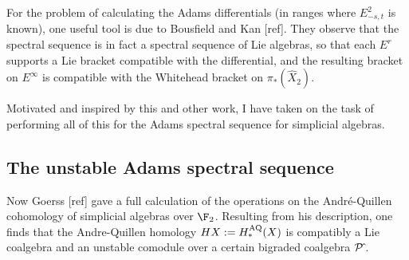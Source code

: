 \documentclass[11pt]{article}
\begin{document}
For the problem of calculating the Adams differentials (in ranges where $E^2_{-s,t}$ is known), one useful tool is due to Bousfield and Kan [ref]. They observe that the spectral sequence is in fact a spectral sequence of Lie algebras, so that each $E^r$ supports a Lie bracket compatible with the differential, and the resulting bracket on $E^\infty$ is compatible with the Whitehead bracket on $\pi_*(\hat X_2)$.

Motivated and inspired by this and other work, I have taken on the task of performing all of this for the Adams spectral sequence for simplicial algebras.







\subsection*{The unstable Adams spectral sequence}
Now Goerss [ref] gave a full calculation of the operations on the Andr\'e-Quillen cohomology of simplicial algebras over $\F_2$. Resulting from his description, one finds that the Andre-Quillen homology $HX:=H_*^\textup{AQ}(X)$ is compatibly a Lie coalgebra and an unstable comodule over a certain bigraded coalgebra $\mathcal{P}\hat{\,}$.
\end{document}
